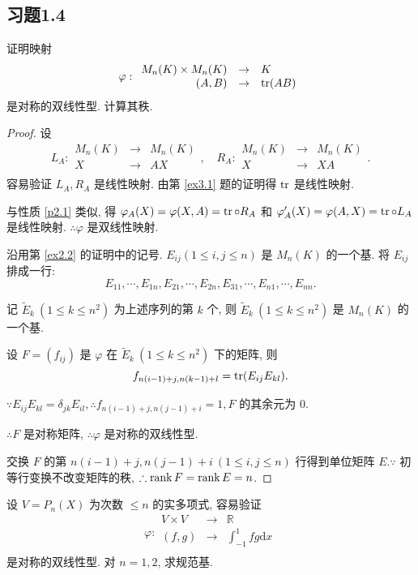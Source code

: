 \documentclass[color=black,device=normal,lang=cn,mode=geye]{elegantnote}
\begin{document}
\subsection{习题1.4}
\begin{exercisec}%
    证明映射
    \[\varphi:\begin{array}{rcl}
        M_n(K)\times M_n(K) & \to & K \\
        (A,B) & \to & \operatorname{tr} (AB) \\
    \end{array}\]
    是对称的双线性型. 计算其秩.
\end{exercisec}
\begin{proof}
    设
    \[L_A:\begin{array}{rcl}
            M_n(K) & \to & M_n(K) \\
            X & \to & AX \\
        \end{array},\quad R_A:\begin{array}{rcl}
            M_n(K) & \to & M_n(K) \\
            X & \to & XA \\
        \end{array}.\]
    容易验证 $L_A,R_A$ 是线性映射. 由第 \ref{ex3.1} 题的证明得 $\operatorname{tr} $ 是线性映射.
    
    与性质 \ref{p2.1} 类似, 得 $\varphi_A(X)=\varphi(X,A)=\operatorname{tr} \circ R_A$ 和 $\varphi_A'(X)=\varphi(A,X)=\operatorname{tr} \circ L_A$ 是线性映射. $\therefore\varphi$ 是双线性映射.

    沿用第 \ref{ex2.2} 的证明中的记号. $E_{ij}(1\leq i,j\leq n)$ 是 $M_n(K)$ 的一个基. 将 $E_{ij}$ 排成一行:
    \[E_{11},\cdots,E_{1n},E_{21},\cdots,E_{2n},E_{31},\cdots,E_{n1},\cdots,E_{nn}.\]

    记 $\tilde{E}_k\ (1\leq k\leq n^2)$ 为上述序列的第 $k$ 个, 则 $\tilde{E}_k\ (1\leq k\leq n^2)$ 是 $M_n(K)$ 的一个基.
    
    设 $F=(f_{ij})$ 是 $\varphi$ 在 $\tilde{E}_k\ (1\leq k\leq n^2)$ 下的矩阵, 则
    \[f_{n(i-1)+j,n(k-1)+l}=\operatorname{tr} (E_{ij}E_{kl}).\]

    $\because E_{ij}E_{kl}=\delta_{jk}E_{il},\therefore f_{n(i-1)+j,n(j-1)+i}=1,F$ 的其余元为 $0$.

    $\therefore F$ 是对称矩阵, $\therefore\varphi$ 是对称的双线性型.

    交换 $F$ 的第 $n(i-1)+j,n(j-1)+i\ (1\leq i,j\leq n)$ 行得到单位矩阵 $E.\because$ 初等行变换不改变矩阵的秩, $\therefore\operatorname{rank} F=\operatorname{rank} E=n$.
\end{proof}
\begin{exercisec}%
    设 $V=P_n(X)$ 为次数 $\leq n$ 的实多项式, 容易验证
    \[\varphi:\begin{array}{rcl}
        V\times V & \to & \mathbb{R} \\
        (f,g) & \to & \int_{-1}^1fg\mathrm{d}x \\
    \end{array}\]
    是对称的双线性型. 对 $n=1,2$, 求规范基.
\end{exercisec}
\end{document}
